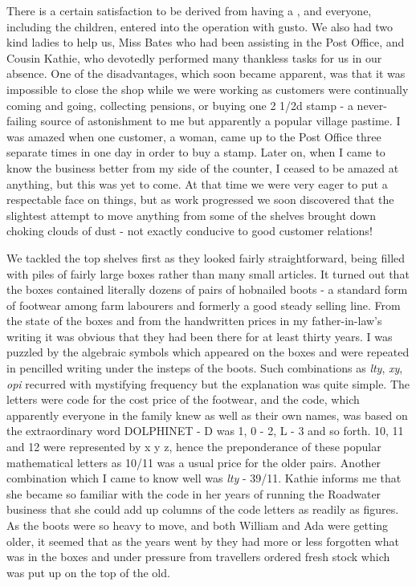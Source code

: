 There is a certain satisfaction to be derived from having a , and everyone, including the children, entered into the operation with gusto. We also had two kind ladies to help us, Miss Bates who had been assisting in the Post Office, and Cousin Kathie, who devotedly performed many thankless tasks for us in our absence. One of the disadvantages, which soon became apparent, was that it was impossible to close the shop while we were working as customers were continually coming and going, collecting pensions, or buying one 2 1/2d stamp - a never-failing source of astonishment to me but apparently a popular village pastime. I was amazed when one customer, a woman, came up to the Post Office three separate times in one day in order to buy a stamp. Later on, when I came to know the business better from my side of the counter, I ceased to be amazed at anything, but this was yet to come. At that time we were very eager to put a respectable face on things, but as work progressed we soon discovered that the slightest attempt to move anything from some of the shelves brought down choking clouds of dust - not exactly conducive to good customer relations!

We tackled the top shelves first as they looked fairly straightforward, being filled with piles of fairly large boxes rather than many small articles. It turned out that the boxes contained literally dozens of pairs of hobnailed boots - a standard form of footwear among farm labourers and formerly a good steady selling line. From the state of the boxes and from the handwritten prices in my father-in-law's writing it was obvious that they had been there for at least thirty years. I was puzzled by the algebraic symbols which appeared on the boxes and were repeated in pencilled writing under the insteps of the boots. Such combinations as \textit{lty}, \textit{xy}, \textit{opi} recurred with mystifying frequency but the explanation was quite simple. The letters were code for the cost price of the footwear, and the code, which apparently everyone in the family knew as well as their own names, was based on the extraordinary word DOLPHINET - D was 1, 0 - 2, L - 3 and so forth. 10, 11 and 12 were represented by x y z, hence the preponderance of these popular mathematical letters as 10/11 was a usual price for the older pairs. Another combination which I came to know well was \textit{lty} - 39/11. Kathie informs me that she became so familiar with the code in her years of running the Roadwater business that she could add up columns of the code letters as readily as figures. As the boots were so heavy to move, and both William and Ada were getting older, it seemed that as the years went by they had more or less forgotten what was in the boxes and under pressure from travellers ordered fresh stock which was put up on the top of the old.

